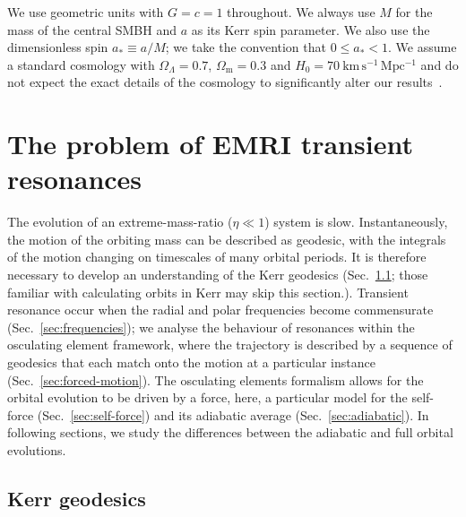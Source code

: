 \documentclass[aps,prd,amsfonts,amssymb,amsmath,nofootinbib,showpacs,superscriptaddress,twocolumn,floatfix]{revtex4-1}
\newcommand{\secref}[1]{Sec.~\ref{sec:#1}}
\newcommand{\units}[1]{\ensuremath{~\mathrm{#1}}}
\newcommand{\sub}[1]{\ensuremath{_\mathrm{#1}}}
\begin{document}
We use geometric units with $G = c = 1$ throughout. We always use $M$ for the mass of the central SMBH and $a$ as its Kerr spin parameter. We also use the dimensionless spin $a_\ast \equiv a/M$; we take the convention that $0 \leq a_\ast < 1$. We assume a standard cosmology with $\Omega_\Lambda = 0.7$, $\Omega\sub{m} = 0.3$ and $H_0 = 70\units{km\, s^{-1}\, Mpc^{-1}}$ and do not expect the exact details of the cosmology to significantly alter our results~\cite{Mapelli2012}.

\section{The problem of EMRI transient resonances}
\label{sec:problem}

The evolution of an extreme-mass-ratio ($\eta \ll 1$) system is slow. Instantaneously, the motion of the orbiting mass can be described as geodesic, with the integrals of the motion changing on timescales of many orbital periods. It is therefore necessary to develop an understanding of the Kerr geodesics (\secref{geodesic}; those familiar with calculating orbits in Kerr may skip this section.). Transient resonance occur when the radial and polar frequencies become commensurate (\secref{frequencies}); we analyse the behaviour of resonances within the osculating element framework, where the trajectory is described by a sequence of geodesics that each match onto the motion at a particular instance (\secref{forced-motion}). The osculating elements formalism allows for the orbital evolution to be driven by a force, here, a particular model for the self-force (\secref{self-force}) and its adiabatic average (\secref{adiabatic}). In following sections, we study the differences between the adiabatic and full orbital evolutions.

\subsection{Kerr geodesics}
\label{sec:geodesic}
\end{document}
